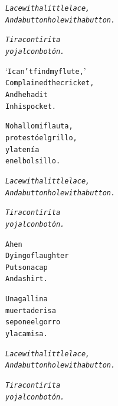 \documentclass[11pt]{article}
\begin{document}
\begin{parcolumns}{2}
\colplacechunks

\colchunk
{
\begin{alltt}\normalfont
\emph{Lace with a little lace,
And a buttonhole with a button.}
\end{alltt}
}

\colchunk
{
\begin{alltt}\normalfont
\emph{Tira con tirita
y ojal con botón.}
\end{alltt}
}

\colplacechunks

\colchunk
{
\begin{alltt}\normalfont
‘I can’t find my flute,’
Complained the cricket,
And he had it
In his pocket.
\end{alltt}
}

\colchunk
{
\begin{alltt}\normalfont
No hallo mi flauta,
protestó el grillo,
y la tenía
en el bolsillo.
\end{alltt}
}

\colplacechunks

\colchunk
{
\begin{alltt}\normalfont
\emph{Lace with a little lace,
And a buttonhole with a button.}
\end{alltt}
}

\colchunk
{
\begin{alltt}\normalfont
\emph{Tira con tirita
y ojal con botón.}
\end{alltt}
}

\colplacechunks

\colchunk
{
\begin{alltt}\normalfont
A hen
Dying of laughter
Puts on a cap
And a shirt.
\end{alltt}
}

\colchunk
{
\begin{alltt}\normalfont
Una gallina
muerta de risa
se pone el gorro
y la camisa.
\end{alltt}
}

\colplacechunks

\colchunk
{
\begin{alltt}\normalfont
\emph{Lace with a little lace,
And a buttonhole with a button.}
\end{alltt}
}

\colchunk
{
\begin{alltt}\normalfont
\emph{Tira con tirita
y ojal con botón.}
\end{alltt}
}

\colplacechunks


\end{parcolumns}
\end{document}
